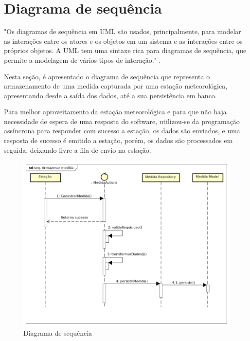 \section{Diagrama de sequência}
\label{sec:diagrama_sequencia}

"Os diagramas de sequência em UML são usados, principalmente, para modelar as interações entre os atores e
os objetos em um sistema e as interações entre os próprios objetos. A UML tem uma sintaxe rica para diagramas
de sequência, que permite a modelagem de vários tipos de interação." \cite{engenharia_software_sommerville}.

Nesta seção, é apresentado o diagrama de sequência que representa o armazenamento de uma medida capturada por uma estação meteorológica, apresentando desde a saída dos dados, até a sua persistência em banco.

Para melhor aproveitamento da estação meteorológica e para que não haja necessidade de espera de uma resposta do software, utilizou-se da programação assíncrona para responder com sucesso a estação, os dados são enviados, e uma resposta de sucesso é emitido a estação, porém, os dados são processados em seguida, deixando livre a fila de envio na estação.

\begin{figure}[H]
    \centering
    \caption{Diagrama de sequência \label{fig:figure_diagrama_sequencia}}
    \includegraphics[scale=0.40]{diagrams/sequencia.png}
    \hfill
{}
\end{figure}

